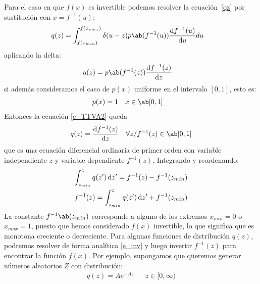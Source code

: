 \documentclass[12pt]{article}
\begin{document}
Para el caso en que $f(x)$ es invertible podemos resolver la
ecuación~\ref{qz} por sustitución con $x=f^{-1}(u)$:
\begin{align}
  q(z)&=\int_{f(x_{min})}^{f(x_{max})} \delta (u-z) p\ab(f^{-1}(u)) \odv{f^{-1}(u)}{u} du
\end{align}
aplicando la delta:
\begin{align}
  q(z)&=p\ab(f^{-1}(z)) \odv{f^{-1}(z)}{z} \label{e_TTVA2}
\end{align}
si además consideramos el caso de $p(x)$ uniforme en el intervalo $[0,1]$, esto es:
\begin{align}
   p(x)&=1 &&  x\in\ab[0,1]   \label{e_uniforme}
\end{align} 
Entonces la ecuación \ref{e_TTVA2} queda
\begin{align}
  q(z)= \odv{f^{-1}(z)}{z}  &&  \forall z/f^{-1}(z)\in\ab[0,1] \label{e_EDO}
\end{align} 
que es una ecuación diferencial ordinaria de primer orden con variable
independiente $z$ y variable dependiente $f^{-1}(z)$. Integrando y reordenando:
\begin{align}
  \int_{z_{min}}^{z} q(z') \odif{z'}=f^{-1}(z)-f^{-1}(z_{min})\\ 
  f^{-1}(z)=\int_{z_{min}}^{z} q(z') \odif{z'}+f^{-1}(z_{min})\label{e_inv} 
\end{align} 
La constante $f^{-1}\ab(z_{min})$ corresponde a alguno de los extremos $x_{min}=0$
o $x_{max}=1$, puesto que hemos considerado $f(x)$ invertible, lo que significa
que es monotona creciente o decreciente.  Para algunas funciones de
distribución $q(z)$, podremos resolver de forma analítica \ref{e_inv} y luego
invertir $f^{-1}(z)$ para encontrar la función $f(x)$.  Por ejemplo,
supongamos que queremos generar números aleatorios $Z$ con distribución:
\begin{align}
  q(z)=Ae^{-Az} && z\in[0,\infty)
\end{align} 
\end{document}
